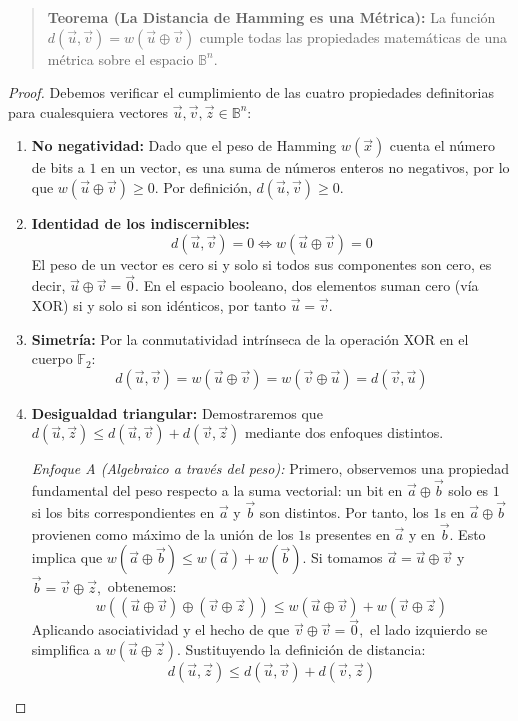 \begin{quote}\textbf{Teorema (La Distancia de Hamming es una Métrica):}\label{hamming_metrica}
La función $d(\vec{u}, \vec{v}) = w(\vec{u} \oplus \vec{v})$ cumple todas las propiedades matemáticas de una métrica sobre el espacio $\mathbb{B}^n.$
\end{quote}
\begin{proof}
Debemos verificar el cumplimiento de las cuatro propiedades definitorias para cualesquiera vectores $\vec{u}, \vec{v}, \vec{z} \in \mathbb{B}^n:$
\begin{enumerate}
    \item \textbf{No negatividad:} Dado que el peso de Hamming $w(\vec{x})$ cuenta el número de bits a $1$ en un vector, es una suma de números enteros no negativos, por lo que $w(\vec{u} \oplus \vec{v}) \ge 0.$ Por definición, $d(\vec{u}, \vec{v}) \ge 0.$
    \item \textbf{Identidad de los indiscernibles:}
    \[ d(\vec{u}, \vec{v}) = 0 \iff w(\vec{u} \oplus \vec{v}) = 0 \]
    El peso de un vector es cero si y solo si todos sus componentes son cero, es decir, $\vec{u} \oplus \vec{v} = \vec{0}.$ En el espacio booleano, dos elementos suman cero (vía XOR) si y solo si son idénticos, por tanto $\vec{u} = \vec{v}.$
    \item \textbf{Simetría:}
    Por la conmutatividad intrínseca de la operación XOR en el cuerpo $\mathbb{F}_2:$
    \[ d(\vec{u}, \vec{v}) = w(\vec{u} \oplus \vec{v}) = w(\vec{v} \oplus \vec{u}) = d(\vec{v}, \vec{u}) \]
    \item \textbf{Desigualdad triangular:} Demostraremos que $d(\vec{u}, \vec{z}) \le d(\vec{u}, \vec{v}) + d(\vec{v}, \vec{z})$ mediante dos enfoques distintos.
    
    \textit{Enfoque A (Algebraico a través del peso):}
    Primero, observemos una propiedad fundamental del peso respecto a la suma vectorial: un bit en $\vec{a} \oplus \vec{b}$ solo es $1$ si los bits correspondientes en $\vec{a}$ y $\vec{b}$ son distintos. Por tanto, los $1$s en $\vec{a} \oplus \vec{b}$ provienen como máximo de la unión de los $1$s presentes en $\vec{a}$ y en $\vec{b}.$ Esto implica que $w(\vec{a} \oplus \vec{b}) \le w(\vec{a}) + w(\vec{b}).$
    Si tomamos $\vec{a} = \vec{u} \oplus \vec{v}$ y $\vec{b} = \vec{v} \oplus \vec{z},$ obtenemos:
    \[ w((\vec{u} \oplus \vec{v}) \oplus (\vec{v} \oplus \vec{z})) \le w(\vec{u} \oplus \vec{v}) + w(\vec{v} \oplus \vec{z}) \]
    Aplicando asociatividad y el hecho de que $\vec{v} \oplus \vec{v} = \vec{0},$ el lado izquierdo se simplifica a $w(\vec{u} \oplus \vec{z}).$ Sustituyendo la definición de distancia:
    \[ d(\vec{u}, \vec{z}) \le d(\vec{u}, \vec{v}) + d(\vec{v}, \vec{z}) \]
    

\end{enumerate}
\end{proof}
